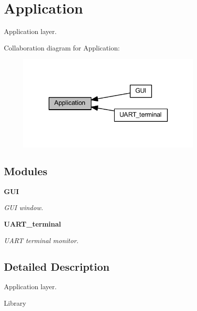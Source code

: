 \section{Application}
\label{group___application}


Application layer.  


Collaboration diagram for Application\+:
\nopagebreak
\begin{figure}[H]
\begin{center}
\leavevmode
\includegraphics[width=263pt]{group___application}
\end{center}
\end{figure}
\subsection*{Modules}
\begin{DoxyCompactItemize}
\item 
\textbf{ G\+UI}
\begin{DoxyCompactList}\small\item\em G\+UI window. \end{DoxyCompactList}\item 
\textbf{ U\+A\+R\+T\+\_\+terminal}
\begin{DoxyCompactList}\small\item\em U\+A\+RT terminal monitor. \end{DoxyCompactList}\end{DoxyCompactItemize}


\subsection{Detailed Description}
Application layer. 

Library 